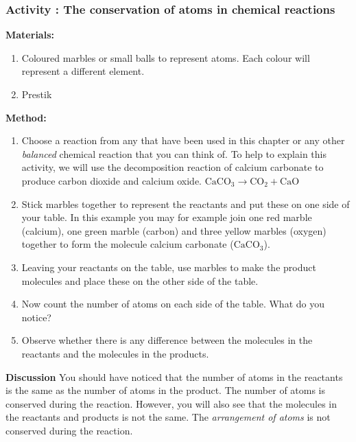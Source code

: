             \subsubsection{ Activity : The conservation of atoms in chemical reactions }
            \nopagebreak
            \label{m38711*id64844}\noindent{}\textbf{Materials:}
      \label{m38711*id64853}\begin{enumerate}[noitemsep, label=\textbf{\arabic*}. ] 
            \label{m38711*uid33}\item Coloured marbles or small balls to represent atoms. Each colour will represent a different element.
\label{m38711*uid34}\item Prestik
\end{enumerate}
        \par 
      \label{m38711*id64882}\noindent{}\textbf{Method:}
      \label{m38711*id64889}\begin{enumerate}[noitemsep, label=\textbf{\arabic*}. ] 
            \label{m38711*uid35}\item Choose a reaction from any that have been used in this chapter or any other \textsl{balanced} chemical reaction that you can think of. To help to explain this activity, we will use the decomposition reaction of calcium carbonate to produce carbon dioxide and calcium oxide.
${\mathrm{CaCO}}_{3}\to {\mathrm{CO}}_{2}+\mathrm{CaO}$
\label{m38711*uid36}\item Stick marbles together to represent the reactants and put these on one side of your table. In this example you may for example join one red marble (calcium), one green marble (carbon) and three yellow marbles (oxygen) together to form the molecule calcium carbonate (${\mathrm{CaCO}}_{3}$).
\label{m38711*uid37}\item Leaving your reactants on the table, use marbles to make the product molecules and place these on the other side of the table.
\label{m38711*uid38}\item Now count the number of atoms on each side of the table. What do you notice?
\label{m38711*uid39}\item Observe whether there is any difference between the molecules in the reactants and the molecules in the products.
\end{enumerate}
        \par 
      \label{m38711*id65031}\noindent{}\textbf{Discussion}
     You should have noticed that the number of atoms in the reactants is the same as the number of atoms in the product. The number of atoms is conserved during the reaction. However, you will also see that the molecules in the reactants and products is not the same. The \textsl{arrangement of atoms} is not conserved during the reaction.
 \par 
\label{m38711*eip-14}
